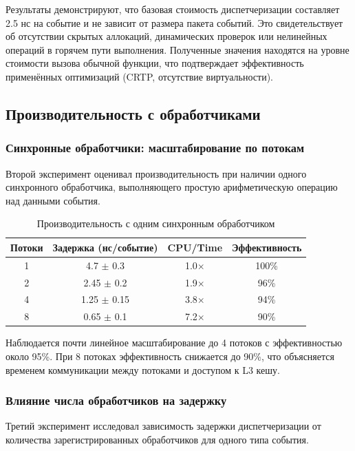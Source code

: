 Результаты демонстрируют, что базовая стоимость диспетчеризации составляет 2.5 нс на событие и не зависит от размера пакета событий. Это свидетельствует об отсутствии скрытых аллокаций, динамических проверок или нелинейных операций в горячем пути выполнения. Полученные значения находятся на уровне стоимости вызова обычной функции, что подтверждает эффективность применённых оптимизаций (CRTP, отсутствие виртуальности).

\subsection{Производительность с обработчиками}

\subsubsection{Синхронные обработчики: масштабирование по потокам}

Второй эксперимент оценивал производительность при наличии одного синхронного обработчика, выполняющего простую арифметическую операцию над данными события.

\begin{table}[H]
\centering
\caption{Производительность с одним синхронным обработчиком}
\label{tab:single_sync_handler}
\begin{tabular}{cccc}
\toprule
\textbf{Потоки} & \textbf{Задержка (нс/событие)} & \textbf{CPU/Time} & \textbf{Эффективность} \\
\midrule
1 & 4.7 $\pm$ 0.3 & 1.0$\times$ & 100\% \\
2 & 2.45 $\pm$ 0.2 & 1.9$\times$ & 96\% \\
4 & 1.25 $\pm$ 0.15 & 3.8$\times$ & 94\% \\
8 & 0.65 $\pm$ 0.1 & 7.2$\times$ & 90\% \\
\bottomrule
\end{tabular}
\end{table}

Наблюдается почти линейное масштабирование до 4 потоков с эффективностью около 95\%. При 8 потоках эффективность снижается до 90\%, что объясняется временем коммуникации между потоками и доступом к L3 кешу.

\subsubsection{Влияние числа обработчиков на задержку}

Третий эксперимент исследовал зависимость задержки диспетчеризации от количества зарегистрированных обработчиков для одного типа события.

